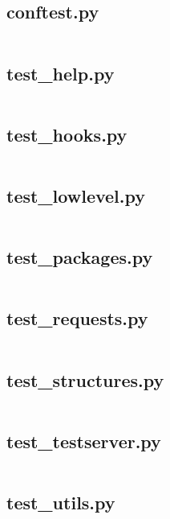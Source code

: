 \documentclass{article}
\begin{document}
\subsection{conftest.py}
\inputminted{python}{/tmp/requests/tests/conftest.py}
\newpage

\subsection{test\_help.py}
\inputminted{python}{/tmp/requests/tests/test_help.py}
\newpage

\subsection{test\_hooks.py}
\inputminted{python}{/tmp/requests/tests/test_hooks.py}
\newpage

\subsection{test\_lowlevel.py}
\inputminted{python}{/tmp/requests/tests/test_lowlevel.py}
\newpage

\subsection{test\_packages.py}
\inputminted{python}{/tmp/requests/tests/test_packages.py}
\newpage

\subsection{test\_requests.py}
\inputminted{python}{/tmp/requests/tests/test_requests.py}
\newpage

\subsection{test\_structures.py}
\inputminted{python}{/tmp/requests/tests/test_structures.py}
\newpage

\subsection{test\_testserver.py}
\inputminted{python}{/tmp/requests/tests/test_testserver.py}
\newpage

\subsection{test\_utils.py}
\inputminted{python}{/tmp/requests/tests/test_utils.py}
\newpage
\end{document}
